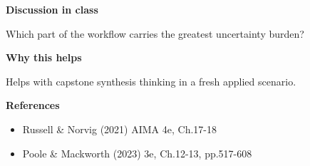 \documentclass[11pt]{article}
\begin{document}
\begin{tcolorbox}[colback=white,colframe=MidnightBlue,title={Q7 DDN and POMDP Synthesis Case},fonttitle=\bfseries,breakable]
{\large\bfseries\color{MidnightBlue} Discussion in class}\par\medskip
Which part of the workflow carries the greatest uncertainty burden?

{\large\bfseries\color{MidnightBlue} Why this helps}\par\medskip
Helps with capstone synthesis thinking in a fresh applied scenario.

{\large\bfseries\color{MidnightBlue} References}\par\medskip
\begin{itemize}\item Russell \& Norvig (2021) AIMA 4e, Ch.17-18
\item Poole \& Mackworth (2023) 3e, Ch.12-13, pp.517-608\end{itemize}
\end{tcolorbox}
\end{document}
